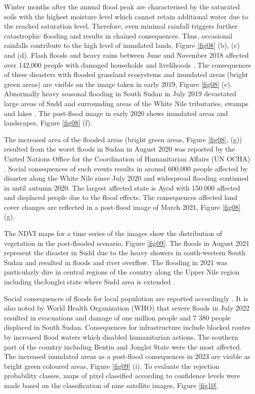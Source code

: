 \documentclass[analytics,article,submit,pdftex,moreauthors]{Definitions/mdpi}
\begin{document}
Winter months after the annual flood peak are characterised by the saturated soils with the highest moisture level which cannot retain additional water due to the reached saturation level. Therefore, even minimal rainfall triggers further catastrophic flooding and results in chained consequences. Thus, occasional rainfalls contribute to the high level of inundated lands, Figure \ref{fig08} (b), (c) and (d). Flash floods and heavy rains between June and November 2018 affected over 142,000 people with damaged households and livelihoods \cite{ReliefWeb2018}. The consequences of these disasters with flooded grassland ecosystems and inundated areas (bright green areas) are visible on the image taken in early 2019, Figure \ref{fig08} (e). Abnormally heavy seasonal flooding in South Sudan in July 2019 devastated large areas of Sudd and surrounding areas of the White Nile tributaries, swamps and lakes \cite{OCHA2019}. The post-flood image in early 2020 shows inundated areas and landscapes, Figure \ref{fig08} (f).

The increased area of the flooded areas (bright green areas, Figure \ref{fig08}, (g)) resulted from the worst floods in Sudan in August 2020 was reported by the United Nations Office for the Coordination of Humanitarian Affairs (UN OCHA) \cite{OCHA2020}. Social consequences of such events results in around 600,000 people affected by disaster along the White Nile since July 2020 and widespread flooding continued in until autumn 2020. The largest affected state is Ayod with 150.000 affected and displaced people due to the flood effects. The consequences affected land cover changes are reflected in a post-flood image of March 2021, Figure \ref{fig08} (g). 

The NDVI maps for a time series of the images show the distribution of vegetation in the post-flooded scenario, Figure \ref{fig09}. The floods in August 2021 represent the disaster in Sudd due to the heavy showers in south-western South Sudan and resulted in floods and river overflow. The flooding in 2021 was particularly dire in central regions of the country along the Upper Nile region including theJonglei state where Sudd area is extended \cite{SouthSudan2021}. 

Social consequences of floods for local population are reported accordingly \cite{ReliefWeb}. It is also noted by World Health Organization (WHO) \cite{WHO2023} that severe floods in July 2022 resulted in evacuations and damage of one million people and 7 380 people displaced in South Sudan. Consequences for infrastructure include blocked routes by increased flood waters which disabled humanitarian actions. The southern part of the country including Bentiu and Jonglei State were the most affected. The increased inundated areas as a post-flood consequences in 2023 are visible as bright green coloured areas, Figure \ref{fig09} (i). To evaluate the rejection probability classes, maps of pixel classified according to confidence levels were made based on the classification of nine satellite images, Figure \ref{fig10}. 
\end{document}
